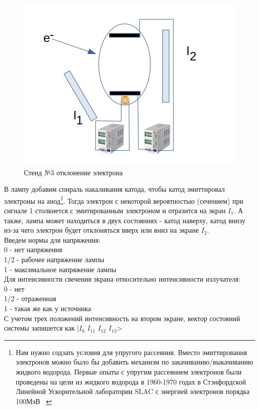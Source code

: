 \documentclass[11pt]{article}
\begin{document}
\begin{figure}[htp]
\centering
\includegraphics[scale=0.40]{st3.png}
\caption{Стенд №3 отклонение электрона}
\label{}
\end{figure}

В лампу добавим спираль накаливания катода, чтобы катод эмиттировал электроны на анод\footnote{Нам нужно содзать условия для упругого рассеяния. Вместо эмиттирования электронов можно было бы добавить механизм по закачиванию/выкачиванию жидкого водорода. Первые опыты с упругим рассеянием электронов были проведены на цели из жидкого водорода в 1960-1970 годах в Стэнфордской Линейной Ускорительной лаборатории SLAC  с энергией электронов порядка 100МэВ ~\cite{Courcera_KvVich} }. Тогда электрон с некоторой вероятностью (сечением) при сигнале 1 столкнется с эмитированным электроном и отразится на экран $I_1$. А также, лампа может находиться в двух состояниях - катод наверху, катод внизу из-за чего электрон будет отклоняться вверх или вниз на экране $I_2$. \\

Введем нормы для напряжения: \\
0 - нет напряжения \\
1/2 - рабочее напряжение лампы \\
1 - максимальное напряжение лампы \\

Для интенсивности свечения экрана относительно интенсивности излучателя:\\
0 - нет \\
1/2 - отраженная \\
1 - такая же как у источника \\

С учетом трех положений интенсивность на втором экране, вектор состояний системы запишется как |$I_0$ $I_{11}$ $I_{12}$ $I_{13}$> \\
\end{document}
